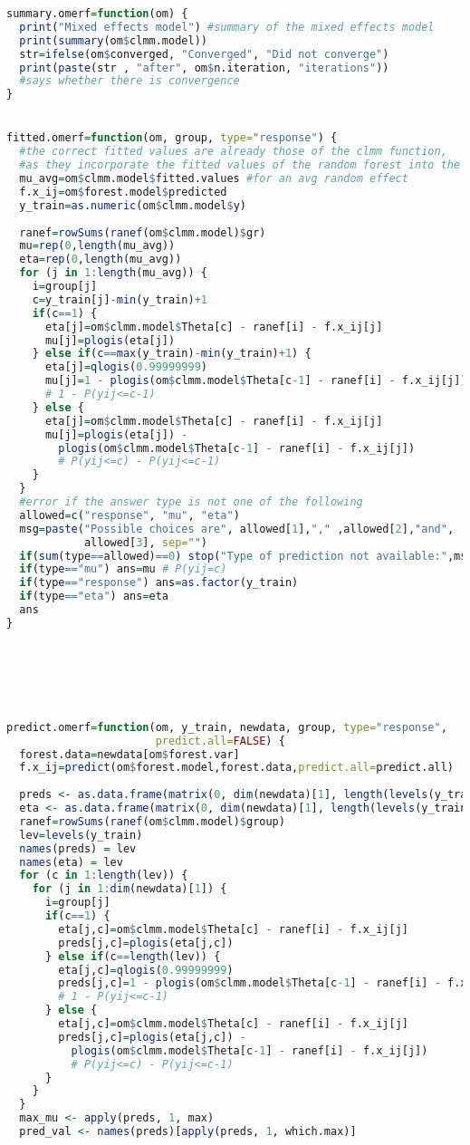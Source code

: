 \begin{lstlisting}[language=R]
summary.omerf=function(om) {
  print("Mixed effects model") #summary of the mixed effects model
  print(summary(om$clmm.model)) 
  str=ifelse(om$converged, "Converged", "Did not converge")
  print(paste(str , "after", om$n.iteration, "iterations"))
  #says whether there is convergence
}


fitted.omerf=function(om, group, type="response") {
  #the correct fitted values are already those of the clmm function,
  #as they incorporate the fitted values of the random forest into the model
  mu_avg=om$clmm.model$fitted.values #for an avg random effect
  f.x_ij=om$forest.model$predicted
  y_train=as.numeric(om$clmm.model$y)
  
  ranef=rowSums(ranef(om$clmm.model)$gr)
  mu=rep(0,length(mu_avg))
  eta=rep(0,length(mu_avg))
  for (j in 1:length(mu_avg)) {
    i=group[j]
    c=y_train[j]-min(y_train)+1
    if(c==1) {
      eta[j]=om$clmm.model$Theta[c] - ranef[i] - f.x_ij[j]
      mu[j]=plogis(eta[j])
    } else if(c==max(y_train)-min(y_train)+1) {
      eta[j]=qlogis(0.99999999)
      mu[j]=1 - plogis(om$clmm.model$Theta[c-1] - ranef[i] - f.x_ij[j])
      # 1 - P(yij<=c-1)
    } else {
      eta[j]=om$clmm.model$Theta[c] - ranef[i] - f.x_ij[j]
      mu[j]=plogis(eta[j]) - 
        plogis(om$clmm.model$Theta[c-1] - ranef[i] - f.x_ij[j])
        # P(yij<=c) - P(yij<=c-1)
    }
  }
  #error if the answer type is not one of the following
  allowed=c("response", "mu", "eta")
  msg=paste("Possible choices are", allowed[1],"," ,allowed[2],"and", 
            allowed[3], sep="")
  if(sum(type==allowed)==0) stop("Type of prediction not available:",msg)
  if(type=="mu") ans=mu # P(yij=c)
  if(type=="response") ans=as.factor(y_train)
  if(type=="eta") ans=eta
  ans
}






predict.omerf=function(om, y_train, newdata, group, type="response", 
                       predict.all=FALSE) {
  forest.data=newdata[om$forest.var]		
  f.x_ij=predict(om$forest.model,forest.data,predict.all=predict.all)
  
  preds <- as.data.frame(matrix(0, dim(newdata)[1], length(levels(y_train))))
  eta <- as.data.frame(matrix(0, dim(newdata)[1], length(levels(y_train))))
  ranef=rowSums(ranef(om$clmm.model)$group)
  lev=levels(y_train)
  names(preds) = lev
  names(eta) = lev
  for (c in 1:length(lev)) {
    for (j in 1:dim(newdata)[1]) {
      i=group[j]
      if(c==1) {
        eta[j,c]=om$clmm.model$Theta[c] - ranef[i] - f.x_ij[j]
        preds[j,c]=plogis(eta[j,c])
      } else if(c==length(lev)) {
        eta[j,c]=qlogis(0.99999999)
        preds[j,c]=1 - plogis(om$clmm.model$Theta[c-1] - ranef[i] - f.x_ij[j])
        # 1 - P(yij<=c-1)
      } else {
        eta[j,c]=om$clmm.model$Theta[c] - ranef[i] - f.x_ij[j]
        preds[j,c]=plogis(eta[j,c]) - 
          plogis(om$clmm.model$Theta[c-1] - ranef[i] - f.x_ij[j])
          # P(yij<=c) - P(yij<=c-1)
      }
    }
  }
  max_mu <- apply(preds, 1, max)
  pred_val <- names(preds)[apply(preds, 1, which.max)]
  

\end{lstlisting}
